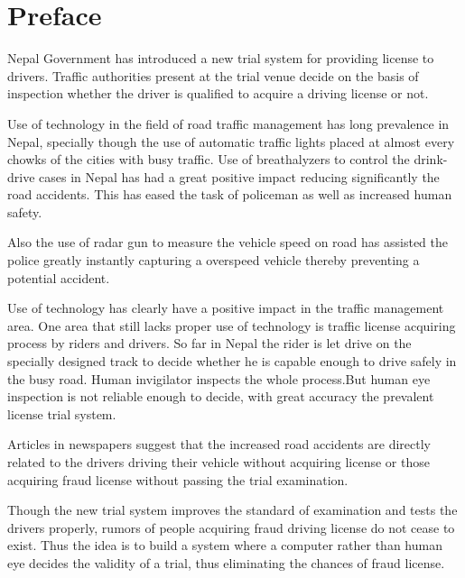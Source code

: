 \section*{Preface}
Nepal Government has introduced a new trial system for providing license to drivers. Traffic authorities present at the trial venue decide on the basis of inspection whether the driver is qualified to acquire a driving license or not.

Use of technology in the field of road traffic management has long prevalence in Nepal, specially though the use of automatic traffic lights placed at almost every chowks of the cities with busy traffic. Use of breathalyzers to control the drink-drive cases in Nepal has had a great positive impact reducing significantly the road accidents. This has eased the task of policeman as well as increased human safety. 


Also the use of radar gun to measure the vehicle speed on road has assisted the police greatly instantly capturing a overspeed vehicle thereby preventing a potential accident. 


Use of technology has clearly have a positive impact in the traffic management area. One area that still lacks proper use of technology is traffic license acquiring process by riders and drivers. So far in Nepal the rider is let drive on the specially designed track to decide whether he is capable enough to drive safely in the busy road. Human invigilator inspects the whole process.But human eye inspection is not reliable enough to decide, with great accuracy the prevalent license trial system.


Articles in newspapers suggest that the increased road accidents are directly related to the drivers driving their vehicle without acquiring license or those acquiring fraud license without passing the trial examination.


Though the new trial system improves the standard of examination and tests the drivers properly, rumors of people acquiring fraud driving license do not cease to exist. Thus the idea is to build a system where a computer rather than human eye decides the validity of a trial, thus eliminating the chances of fraud license.


